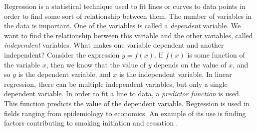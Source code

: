 \documentclass[a4paper,11pt]{article}
\begin{document}
   Regression is a statistical technique used to fit lines or curves to data
   points in order to find some sort of relationship between them. The number of
   variables in the data is important. One of the variables is called a
   \emph{dependent} variable. We want to find the relationship between this
   variable and the other variables, called \emph{independent} variables. What
   makes one variable dependent and another independent? Consider the expression
   $y=f(x)$. If $f(x)$ is some function of the variable $x$, then we know that
   the value of $y$ depends on the value of $x$, and so $y$ is the dependent
   variable, and $x$ is the independent variable. In linear regression, there
   can be multiple independent variables, but only a single dependent
   variable. In order to fit a line to data, a \emph{predictor function} is
   used. This function predicts the value of the dependent variable. Regression
   is used in fields ranging from epidemiology to economics. An example of its
   use is finding factors contributing to smoking initiation and cessation
   \cite{van2005determinants}.
\end{document}

